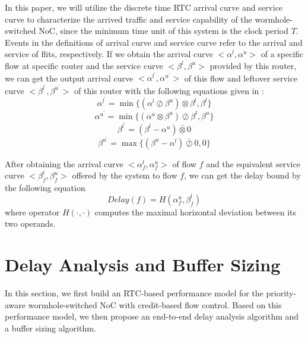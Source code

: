 \documentclass[preprint]{elsarticle}
\begin{document}
In this paper, we will utilize the discrete time RTC arrival curve and service curve to characterize the arrived traffic and service capability of the wormhole-switched NoC, since the minimum time unit of this system is the clock period $T$. Events in the definitions of arrival curve and service curve refer to the arrival and service of flits, respectively. If we obtain the arrival curve $<\alpha^l,\alpha^u>$ of a specific flow at specific router and the service curve $<\beta^l,\beta^u>$ provided by this router, we can get the output arrival curve $<\alpha^{l^\prime},\alpha^{u^\prime}>$ of this flow and leftover service curve $<\beta^{l^\prime},\beta^{u^\prime}>$ of this router with the following equations given in \cite{1253607}:
\begin{equation}\label{alphal}
\alpha^{l^\prime}=\min\{(\alpha^l\oslash\beta^u)\otimes\beta^l,\beta^l\}
\end{equation}
\begin{equation}\label{alphau}
\alpha^{u^\prime}=\min\{(\alpha^u\otimes\beta^u)\oslash\beta^l,\beta^u\}
\end{equation}
\begin{equation}\label{betal}
\beta^{l^\prime}=(\beta^l-\alpha^u)\bar{\otimes}0
\end{equation}
\begin{equation}\label{betau}
\beta^{u^\prime}=\max\{(\beta^u-\alpha^l)\bar{\oslash}0,0\}
\end{equation}

After obtaining the arrival curve $<\alpha^l_{f},\alpha^u_{f}>$ of flow $f$ and the equivalent service curve $<\beta_{f}^l,\beta_{f}^u>$ offered by the system to flow $f$, we can get the delay bound by the following equation \cite{Boudec2001Network}
\begin{equation}\label{delay}
Delay(f)=H(\alpha^u_{f},\beta^l_{f})
\end{equation}
where operator $H(\cdot,\cdot)$ computes the maximal horizontal deviation between its two operands.

\section{Delay Analysis and Buffer Sizing}\label{modeling}
In this section, we first build an RTC-based performance model for the priority-aware wormhole-switched NoC with credit-based flow control. Based on this performance model, we then propose an end-to-end delay analysis algorithm and a buffer sizing algorithm.
\end{document}
